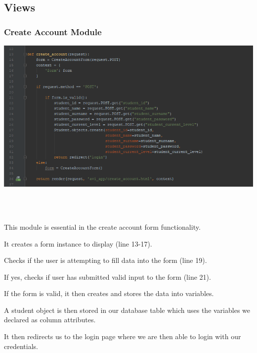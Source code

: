 \documentclass[10pt]{article}
\begin{document}
\subsection{Views}

\subsubsection{Create Account Module}

\begin{center}
\includegraphics[width=1.1\textwidth]{p6.png}
\end{center} \\ \\

\begin{description}[font=$\bullet$~\normalfont\scshape\color{red!50!black}]
\item [] This module is essential in the create account form functionality. 
\item [] It creates a form instance to display (line 13-17).
\item [] Checks if the user is attempting to fill data into the form (line 19).
\item [] If yes, checks if user has submitted valid input to the form (line 21).
\item [] If the form is valid, it then creates and stores the data into variables.
\item [] A student object is then stored in our database table which uses the variables we declared as column attributes.
\item [] It then redirects us to the login page where we are then able to login with our credentials.

\end{description}
\end{document}
